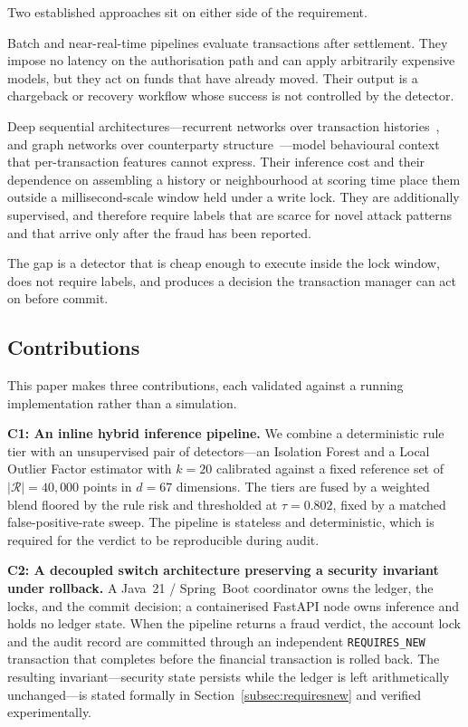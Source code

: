 \documentclass[conference]{IEEEtran}
\begin{document}
Two established approaches sit on either side of the requirement.

Batch and near-real-time pipelines evaluate transactions after
settlement. They impose no latency on the authorisation path and can
apply arbitrarily expensive models, but they act on funds that have
already moved. Their output is a chargeback or recovery workflow whose
success is not controlled by the detector.

Deep sequential architectures---recurrent networks over transaction
histories~\cite{jurgovsky2018}, and graph networks over counterparty
structure~\cite{dou2020}---model behavioural context that
per-transaction features cannot express. Their inference cost and their
dependence on assembling a history or neighbourhood at scoring time
place them outside a millisecond-scale window held under a write lock.
They are additionally supervised, and therefore require labels that are
scarce for novel attack patterns and that arrive only after the fraud
has been reported.

The gap is a detector that is cheap enough to execute inside the lock
window, does not require labels, and produces a decision the
transaction manager can act on before commit.

\subsection{Contributions}
\label{subsec:contributions}

This paper makes three contributions, each validated against a running
implementation rather than a simulation.

\textbf{C1: An inline hybrid inference pipeline.} We combine a
deterministic rule tier with an unsupervised pair of detectors---an
Isolation Forest and a Local Outlier Factor estimator with $k=20$
calibrated against a fixed reference set of $|\mathcal{R}|=40{,}000$
points in $d=67$ dimensions. The tiers are fused by a weighted blend
floored by the rule risk and thresholded at $\tau = 0.802$, fixed by a
matched false-positive-rate sweep. The pipeline is stateless and
deterministic, which is required for the verdict to be reproducible
during audit.

\textbf{C2: A decoupled switch architecture preserving a security
invariant under rollback.} A Java~21 / Spring~Boot coordinator owns the
ledger, the locks, and the commit decision; a containerised FastAPI node
owns inference and holds no ledger state. When the pipeline returns a
fraud verdict, the account lock and the audit record are committed
through an independent \texttt{REQUIRES\_NEW} transaction that completes
before the financial transaction is rolled back. The resulting
invariant---security state persists while the ledger is left
arithmetically unchanged---is stated formally in
Section~\ref{subsec:requiresnew} and verified experimentally.
\end{document}
